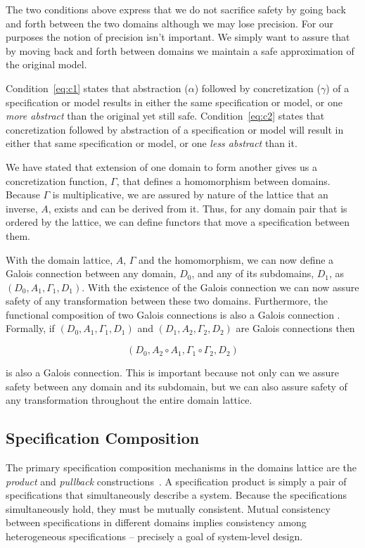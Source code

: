 \documentclass[12pt]{article}
\begin{document}
The two conditions above express that we do not sacrifice safety by
going back and forth between the two domains although we may lose
precision.  For our purposes the notion of precision isn't important.
We simply want to assure that by moving back and forth between domains
we maintain a safe approximation of the original model.

Condition~\ref{eq:c1} states that abstraction ($\alpha$) followed by
concretization ($\gamma$) of a specification or model results in
either the same specification or model, or one \emph{more abstract}
than the original yet still safe.  Condition~\ref{eq:c2} states that
concretization followed by abstraction of a specification or model will result
in either that same specification or model, or one \emph{less abstract} than
it.

We have stated that extension of one domain to form another gives us a
concretization function, $\Gamma$, that defines a homomorphism between
domains.  Because $\Gamma$ is multiplicative, we are assured by nature
of the lattice that an inverse, $A$, exists and can be derived from
it.  Thus, for any domain pair that is ordered by the lattice, we can
define functors that move a specification between them.

With the domain lattice, $A$, $\Gamma$ and the homomorphism, we can
now define a Galois connection between any domain, $D_0$, and any of
its subdomains, $D_1$, as $(D_0,A_1,\Gamma_1,D_1)$.  With the
existence of the Galois connection we can now assure safety of any
transformation between these two domains.  Furthermore, the
functional composition of two Galois connections is also a Galois
connection \cite{Nielson:05:Principles-of-P}. Formally, if $(D_0, A_1,
\Gamma_1, D_1)$ and $(D_1, A_2, \Gamma_2,D_2)$ are Galois connections
then

\[(D_0, A_2 \circ A_1, \Gamma_1 \circ \Gamma_2, D_2)\]

\noindent is also a Galois connection.  This is important because not only
can we assure safety between any domain and its subdomain, but we can
also assure safety of any transformation throughout the entire domain
lattice.  

\subsection{Specification Composition}

The primary specification composition mechanisms in the domains
lattice are the \emph{product} and \emph{pullback}
constructions~\cite{Ehrig:85:Fundamentals-of}.  A specification
product is simply a pair of specifications that simultaneously
describe a system.  Because the specifications simultaneously hold,
they must be mutually consistent.  Mutual consistency between
specifications in different domains implies consistency among
heterogeneous specifications -- precisely a goal of system-level
design.
\end{document}
